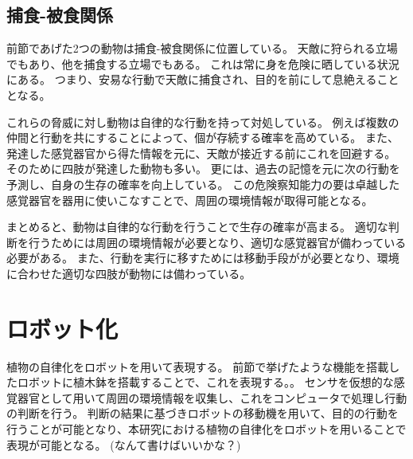 \subsection{捕食-被食関係}
前節であげた2つの動物は捕食-被食関係に位置している。
天敵に狩られる立場でもあり、他を捕食する立場でもある。
これは常に身を危険に晒している状況にある。
つまり、安易な行動で天敵に捕食され、目的を前にして息絶えることとなる。
\par これらの脅威に対し動物は自律的な行動を持って対処している。
例えば複数の仲間と行動を共にすることによって、個が存続する確率を高めている。
また、発達した感覚器官から得た情報を元に、天敵が接近する前にこれを回避する。
そのために四肢が発達した動物も多い。
更には、過去の記憶を元に次の行動を予測し、自身の生存の確率を向上している。
この危険察知能力の要は卓越した感覚器官を器用に使いこなすことで、周囲の環境情報が取得可能となる。
\par まとめると、動物は自律的な行動を行うことで生存の確率が高まる。
適切な判断を行うためには周囲の環境情報が必要となり、適切な感覚器官が備わっている必要がある。
また、行動を実行に移すためには移動手段がが必要となり、環境に合わせた適切な四肢が動物には備わっている。

\section{ロボット化}
植物の自律化をロボットを用いて表現する。
前節で挙げたような機能を搭載したロボットに植木鉢を搭載することで、これを表現する。。
センサを仮想的な感覚器官として用いて周囲の環境情報を収集し、これをコンピュータで処理し行動の判断を行う。
判断の結果に基づきロボットの移動機を用いて、目的の行動を行うことが可能となり、本研究における植物の自律化をロボットを用いることで表現が可能となる。
(なんて書けばいいかな？)
